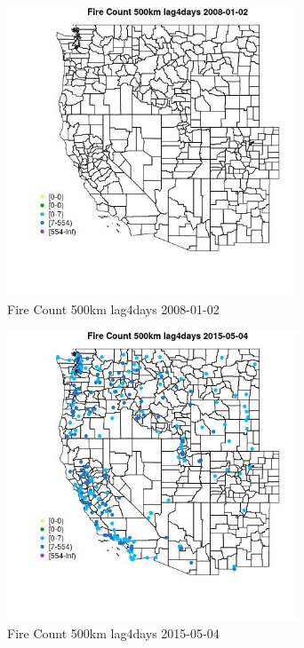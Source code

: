 \begin{figure} 
\centering  
\includegraphics[width=0.77\textwidth]{Code_Outputs/Report_ML_input_PM25_Step4_part_e_de_duplicated_aves_compiled_2019-05-18wNAs_MapObsFire_Count_500km_lag4days2008-01-02.jpg} 
\caption{\label{fig:Report_ML_input_PM25_Step4_part_e_de_duplicated_aves_compiled_2019-05-18wNAsMapObsFire_Count_500km_lag4days2008-01-02}Fire Count 500km lag4days 2008-01-02} 
\end{figure} 
 

\begin{figure} 
\centering  
\includegraphics[width=0.77\textwidth]{Code_Outputs/Report_ML_input_PM25_Step4_part_e_de_duplicated_aves_compiled_2019-05-18wNAs_MapObsFire_Count_500km_lag4days2015-05-04.jpg} 
\caption{\label{fig:Report_ML_input_PM25_Step4_part_e_de_duplicated_aves_compiled_2019-05-18wNAsMapObsFire_Count_500km_lag4days2015-05-04}Fire Count 500km lag4days 2015-05-04} 
\end{figure} 
 

